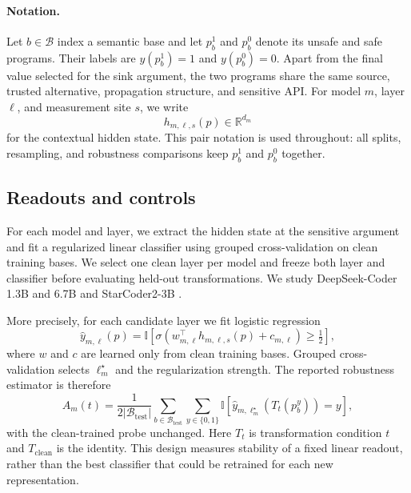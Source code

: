 \documentclass{article}
\begin{document}
\paragraph{Notation.}
Let $b\in\mathcal{B}$ index a semantic base and let
$p_b^1$ and $p_b^0$ denote its unsafe and safe programs. Their labels are
$y(p_b^1)=1$ and $y(p_b^0)=0$. Apart from the final value selected for the
sink argument, the two programs share the same source, trusted alternative,
propagation structure, and sensitive API. For model $m$, layer $\ell$, and
measurement site $s$, we write
\begin{equation}
  h_{m,\ell,s}(p)\in\mathbb{R}^{d_m}
  \label{eq:hidden}
\end{equation}
for the contextual hidden state. This pair notation is used throughout: all
splits, resampling, and robustness comparisons keep $p_b^1$ and $p_b^0$
together.

\subsection{Readouts and controls}
For each model and layer, we extract the hidden state at the sensitive argument and fit a regularized linear classifier using grouped cross-validation on clean training bases. We select one clean layer per model and freeze both layer and classifier before evaluating held-out transformations. We study DeepSeek-Coder 1.3B and 6.7B \cite{guo2024deepseek} and StarCoder2-3B \cite{lozhkov2024starcoder2}.

More precisely, for each candidate layer we fit logistic regression
\begin{equation}
 \hat{y}_{m,\ell}(p)=
 \mathbb{I}\!\left[\sigma\!\left(w_{m,\ell}^{\top}
 h_{m,\ell,s}(p)+c_{m,\ell}\right)\geq\tfrac12\right],
 \label{eq:probe}
\end{equation}
where $w$ and $c$ are learned only from clean training bases. Grouped
cross-validation selects $\ell_m^\star$ and the regularization strength.
The reported robustness estimator is therefore
\begin{equation}
 A_m(t)=\frac{1}{2|\mathcal{B}_{\mathrm{test}}|}
 \sum_{b\in\mathcal{B}_{\mathrm{test}}}\sum_{y\in\{0,1\}}
 \mathbb{I}[\hat y_{m,\ell_m^\star}(T_t(p_b^y))=y],
 \label{eq:accuracy}
\end{equation}
with the clean-trained probe unchanged. Here $T_t$ is transformation
condition $t$ and $T_{\mathrm{clean}}$ is the identity. This design measures
stability of a fixed linear readout, rather than the best classifier that
could be retrained for each new representation.
\end{document}

